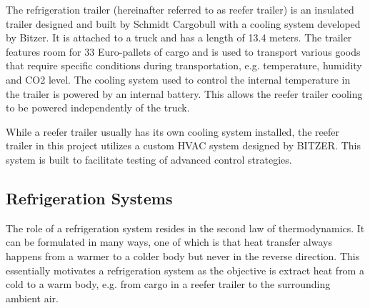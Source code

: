 The refrigeration trailer (hereinafter referred to as reefer trailer) is an insulated trailer designed and built by Schmidt Cargobull with a cooling system developed by Bitzer. It is attached to a truck and has a length of 13.4 meters. The trailer features room for 33 Euro-pallets of cargo and is used to transport various goods that require specific  conditions during transportation, e.g. temperature, humidity and CO2 level. The cooling system used to control the internal temperature in the trailer is powered by an internal battery. This allows the reefer trailer cooling to be powered independently of the truck.

While a reefer trailer usually has its own cooling system installed, the reefer trailer in this project utilizes a custom HVAC system designed by BITZER. This system is built to facilitate testing of advanced control strategies.

\subsection{Refrigeration Systems}
The role of a refrigeration system resides in the second law of thermodynamics. It can be formulated in many ways, one of which is that heat transfer always happens from a warmer to a colder body but never in the reverse direction. This essentially motivates a refrigeration system as the objective is extract heat from a cold to a warm body, e.g. from cargo in a reefer trailer to the surrounding ambient air.

